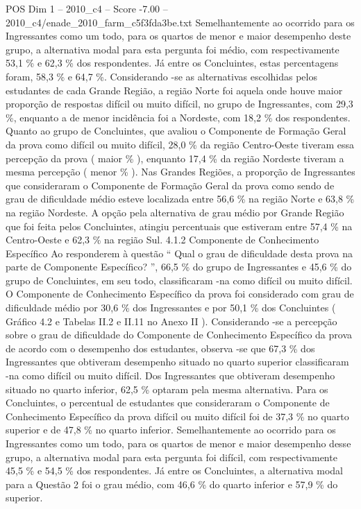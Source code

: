 \begin{textsample}{POS Dim 1 – 2010\_c4 – Score -7.00 – 2010\_c4/enade\_2010\_farm\_c5f3fda3be.txt}
Semelhantemente ao ocorrido para os Ingressantes como um todo, para os quartos de menor e maior desempenho deste grupo, a alternativa modal para esta pergunta foi médio, com respectivamente 53,1 \% e 62,3 \% dos respondentes.
Já entre os Concluintes, estas percentagens foram, 58,3 \% e 64,7 \%.
Considerando -se as alternativas escolhidas pelos estudantes de cada Grande Região, a região Norte foi aquela onde houve maior proporção de respostas difícil ou muito difícil, no grupo de Ingressantes, com 29,3 \%, enquanto a de menor incidência foi a Nordeste, com 18,2 \% dos respondentes.
Quanto ao grupo de Concluintes, que avaliou o Componente de Formação Geral da prova como difícil ou muito difícil, 28,0 \% da região Centro-Oeste tiveram essa percepção da prova ( maior \% ), enquanto 17,4 \% da região Nordeste tiveram a mesma percepção ( menor \% ).
Nas Grandes Regiões, a proporção de Ingressantes que consideraram o Componente de Formação Geral da prova como sendo de grau de dificuldade médio esteve localizada entre 56,6 \% na região Norte e 63,8 \% na região Nordeste.
A opção pela alternativa de grau médio por Grande Região que foi feita pelos Concluintes, atingiu percentuais que estiveram entre 57,4 \% na Centro-Oeste e 62,3 \% na região Sul. 4.1.2 Componente de Conhecimento Específico Ao responderem à questão “ Qual o grau de dificuldade desta prova na parte de Componente Específico? ”, 66,5 \% do grupo de Ingressantes e 45,6 \% do grupo de Concluintes, em seu todo, classificaram -na como difícil ou muito difícil.
O Componente de Conhecimento Específico da prova foi considerado com grau de dificuldade médio por 30,6 \% dos Ingressantes e por 50,1 \% dos Concluintes ( Gráfico 4.2 e Tabelas II.2 e II.11 no Anexo II ).
Considerando -se a percepção sobre o grau de dificuldade do Componente de Conhecimento Específico da prova de acordo com o desempenho dos estudantes, observa -se que 67,3 \% dos Ingressantes que obtiveram desempenho situado no quarto superior classificaram -na como difícil ou muito difícil.
Dos Ingressantes que obtiveram desempenho situado no quarto inferior, 62,5 \% optaram pela mesma alternativa.
Para os Concluintes, o percentual de estudantes que consideraram o Componente de Conhecimento Específico da prova difícil ou muito difícil foi de 37,3 \% no quarto superior e de 47,8 \% no quarto inferior.
Semelhantemente ao ocorrido para os Ingressantes como um todo, para os quartos de menor e maior desempenho desse grupo, a alternativa modal para esta pergunta foi difícil, com respectivamente 45,5 \% e 54,5 \% dos respondentes.
Já entre os Concluintes, a alternativa modal para a Questão 2 foi o grau médio, com 46,6 \% do quarto inferior e 57,9 \% do superior.

\end{textsample}
